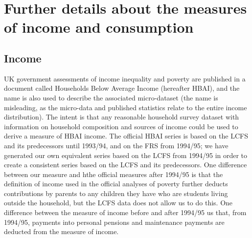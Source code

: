 \section{Further details about the measures of income and consumption}\label{data_annex}





\subsection{Income}
UK government assessments of income inequality and poverty are published in a document called Households Below Average Income (hereafter HBAI), and the name is also used to describe the associated micro-dataset (the name is misleading, as the micro-data and published statistics relate to the entire income distribution). The intent is that any reasonable household survey dataset with information on household composition and sources of income could be used to derive a measure of HBAI income. The official HBAI series is based on the LCFS and its predecessors until 1993/94, and on the FRS from 1994/95;  we have generated our own equivalent series based on the LCFS from 1994/95 in order to create a consistent series based on the LCFS and its predecessors. One difference between our measure and hthe official measures after 1994/95 is that the definition of income used in the official analyses of poverty further deducts contributions by parents to any children they have who are students living outside the household, but the LCFS data does not allow us to do this. One difference between  the measure of income before and after 1994/95 us that, from 1994/95,  payments into personal pensions and maintenance payments are deducted from the measure of income.

